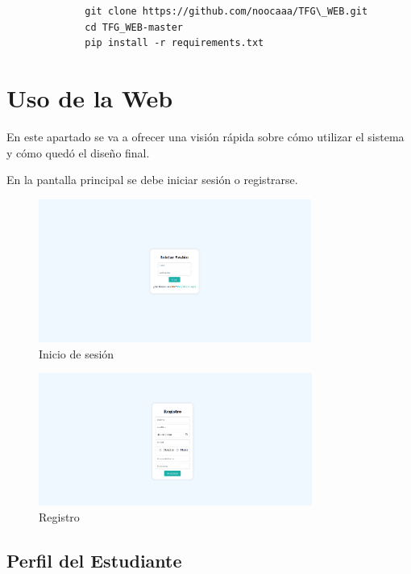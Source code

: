 \begin{appendices}
\begin{figure}[H]
    \centering
    \begin{lstlisting}
        git clone https://github.com/noocaaa/TFG\_WEB.git
        cd TFG_WEB-master
        pip install -r requirements.txt
    \end{lstlisting}
\end{figure}

\section {Uso de la Web}

En este apartado se va a ofrecer una visión rápida sobre cómo utilizar el sistema y cómo quedó el diseño final. 

En la pantalla principal se debe iniciar sesión o registrarse. 

\begin{figure}[H]
    \centering
    \includegraphics[width=0.8\textwidth]{imagenes/Manual/inicio.png}
    \caption{Inicio de sesión}
\end{figure}

\begin{figure}[H]
    \centering
    \includegraphics[width=0.8\textwidth]{imagenes/Manual/registro.png}
    \caption{Registro}
\end{figure}

\subsection {Perfil del Estudiante}


\end{appendices}
